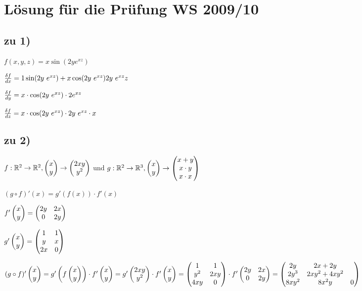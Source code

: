 \renewcommand{\ldate}{2016-01-14}


\section{Lösung für die Prüfung WS 2009/10}

\subsection{zu 1)}
$ f(x,y,z) = x \sin(2y e^{xz}) $ 

$ \frac{\delta f}{dx} = 1 \sin(2y\ e^{xz}) + x \cos(2y\ e^{xz}) 2y\ e^{xz} z $

$ \frac{\delta f}{dy} = x\cdot \cos(2y\ e^{xz}) \cdot 2e^{xz} $

$ \frac{\delta f}{dz} = x \cdot \cos(2y\ e^{xz}) \cdot 2y\ e^{xz} \cdot x $

\subsection{zu 2)}
$ f: \mathbb{R}^2 \rightarrow \mathbb{R}^2,  \begin{pmatrix} x\\y \end{pmatrix}  \rightarrow  \begin{pmatrix} 2xy\\y^2 \end{pmatrix}  $ und $ g: \mathbb{R}^2 \rightarrow \mathbb{R}^3,  \begin{pmatrix} x\\y \end{pmatrix}  \rightarrow  \begin{pmatrix} x+y\\x\cdot y\\x\cdot x \end{pmatrix}  $

$ (g\circ f)'(x) = g'(f(x)) \cdot f'(x) $

$ f' \begin{pmatrix} x\\y \end{pmatrix}  =  \begin{pmatrix} 2y & 2x\\0 & 2y \end{pmatrix}  $

$ g' \begin{pmatrix} x\\y \end{pmatrix}  =  \begin{pmatrix} 1 & 1\\y & x\\2x & 0 \end{pmatrix}  $

$ (g\circ f)' \begin{pmatrix} x\\y \end{pmatrix}  = g'  \left( f \begin{pmatrix} x\\y \end{pmatrix}  \right)  \cdot f' \begin{pmatrix} x\\y \end{pmatrix}  
= g' \begin{pmatrix} 2xy\\y^2 \end{pmatrix}  \cdot f' \begin{pmatrix} x\\y \end{pmatrix} 
=  \begin{pmatrix} 1 & 1\\y^2 & 2xy\\4xy & 0 \end{pmatrix}  \cdot f' \begin{pmatrix} 2y & 2x\\0 & 2y \end{pmatrix} 
=  \begin{pmatrix} 2y & 2x + 2y\\2y^3 & 2xy^2 + 4xy^2\\8xy^2 & 8x^2y & 0 \end{pmatrix} 
$

